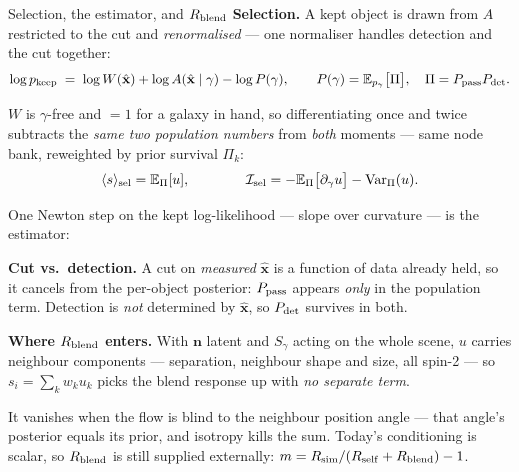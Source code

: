 \documentclass[aspectratio=169,10pt]{beamer}
\newcommand{\xh}{\hat{\mathbf{x}}}
\newcommand{\nb}{\mathbf{n}}
\newcommand{\Rsf}{R_{\rm self}}
\newcommand{\Rbl}{R_{\rm blend}}
\begin{document}
\begin{frame}{Selection, the estimator, and $\Rbl$ }
\vspace{1mm}
{\small \textbf{Selection.} A kept object is drawn from $A$ restricted to the cut and
\emph{renormalised} --- one normaliser handles detection and the cut together:}
\vspace{-2mm}
\[ \log p_{\rm keep}\;=\;\log W(\xh)+\log A(\xh\mid\gamma)-\log P(\gamma),
   \qquad P(\gamma)=\mathbb{E}_{p_\gamma}\big[\Pi\big],\quad \Pi=P_{\rm pass}P_{\rm det} . \]

\vspace{-2mm}
{\small $W$ is $\gamma$-free and $=1$ for a galaxy in hand, so differentiating once and twice subtracts
the \emph{same two population numbers} from \emph{both} moments --- same node bank, reweighted by prior
survival $\Pi_k$:}
\vspace{-2mm}
\[ \langle s\rangle_{\rm sel}=\mathbb{E}_{\Pi}[u],
   \qquad\qquad
   \mathcal{I}_{\rm sel}=-\mathbb{E}_{\Pi}\big[\partial_\gamma u\big]-\mathrm{Var}_{\Pi}(u) . \]

\vspace{-1mm}
{\small One Newton step on the kept log-likelihood --- slope over curvature --- is the estimator:}
\vspace{-1mm}
\begin{center}
\end{center}

\vspace{0mm}
{\footnotesize \textbf{Cut vs.\ detection.} A cut on \emph{measured} $\xh$ is a function of data already
held, so it cancels from the per-object posterior: $P_{\rm pass}$ appears \emph{only} in the population
term. Detection is \emph{not} determined by $\xh$, so $P_{\rm det}$ survives in both.}

\vspace{1mm}
{\footnotesize \textbf{Where $\Rbl$ enters.} With $\nb$ latent and $S_\gamma$ acting on the whole scene,
$u$ carries neighbour components --- separation, neighbour shape and size, all spin-2 --- so
$s_i=\sum_kw_ku_k$ picks the blend response up with \emph{no separate term}.}

\vspace{0mm}
{\scriptsize\color{black!75}
It vanishes when the flow is blind to the neighbour position angle --- that angle's posterior equals
its prior, and isotropy kills the sum. Today's conditioning is scalar, so $\Rbl$ is still supplied
externally: $m=R_{\rm sim}/(\Rsf+\Rbl)-1$.}
\end{frame}
\end{document}

